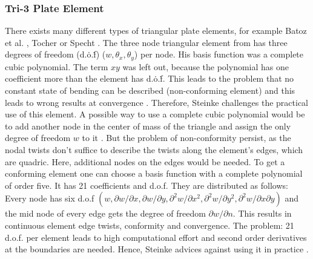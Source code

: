   \subsubsection{Tri-3 Plate Element}\label{sec:Shell-Plate-Tri}
  There exists many different types of triangular plate elements, for example Batoz et al. \cite{batoz1980study}, Tocher \cite{tocher1963analysis} or Specht \cite{specht1988modified}. The three node triangular element from \cite{tocher1963analysis} has three degrees of freedom (d.\.o.\.f) ($w, \theta_x, \theta_y$) per node. His basis function was a complete cubic polynomial. The term $xy$ was left out, because the polynomial has one coefficient more than the element has d.\.o.\.f. This leads to the problem that no constant state of bending can be described (non-conforming element) and this leads to wrong results at convergence \cite{steinke2005finite}. Therefore, Steinke challenges the practical use of this element.
  A possible way to use a complete cubic polynomial would be to add another node in the center of mass of the triangle and assign the only degree of freedom $w$ to it \cite{steinke2005finite}. But the problem of non-conformity persist, as the nodal twists don't suffice to describe the twists along the element's edges, which are quadric. Here, additional nodes on the edges would be needed.
  To get a conforming element one can choose a basis function with a complete polynomial of order five. It has 21 coefficients and d.o.f. They are distributed as follows: Every node has six d.o.f $(w, \partial w/\partial x, \partial w/\partial y, \partial^2 w/\partial x^2, \partial^2 w/\partial y^2, \partial^2 w/\partial x\partial y)$ and the mid node of every edge gets the degree of freedom $\partial w/\partial n$. This results in continuous element edge twists, conformity and convergence. The problem: 21 d.o.f. per element leads to high computational effort and second order derivatives at the boundaries are needed. Hence, Steinke advices against using it in practice \cite{steinke2005finite}.
  
